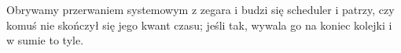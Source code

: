 Obrywamy przerwaniem systemowym z zegara i budzi się scheduler i patrzy, czy komuś nie skończył się jego kwant czasu; jeśli tak, wywala go na koniec kolejki i w sumie to tyle. 